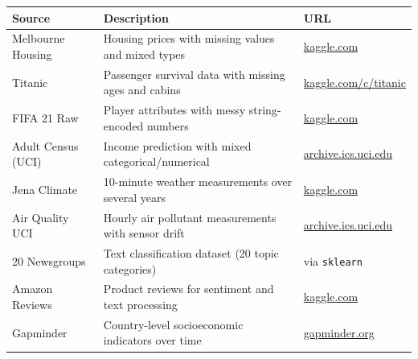 \documentclass[12pt,a4paper,twoside]{book}
\begin{document}
\begin{longtable}{p{4cm}p{8cm}p{3cm}}
\toprule
\textbf{Source} & \textbf{Description} & \textbf{URL} \\
\midrule
Melbourne Housing & Housing prices with missing values and mixed types & \url{kaggle.com} \\
Titanic & Passenger survival data with missing ages and cabins & \url{kaggle.com/c/titanic} \\
FIFA 21 Raw & Player attributes with messy string-encoded numbers & \url{kaggle.com} \\
Adult Census (UCI) & Income prediction with mixed categorical/numerical & \url{archive.ics.uci.edu} \\
Jena Climate & 10-minute weather measurements over several years & \url{kaggle.com} \\
Air Quality UCI & Hourly air pollutant measurements with sensor drift & \url{archive.ics.uci.edu} \\
20 Newsgroups & Text classification dataset (20 topic categories) & via \texttt{sklearn} \\
Amazon Reviews & Product reviews for sentiment and text processing & \url{kaggle.com} \\
Gapminder & Country-level socioeconomic indicators over time & \url{gapminder.org} \\
\bottomrule
\end{longtable}




\printindex
\end{document}
